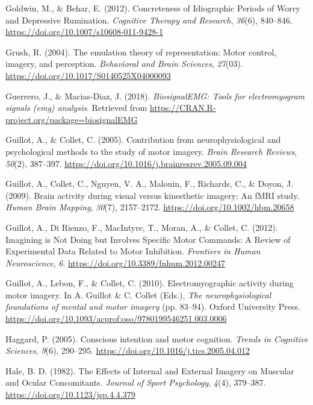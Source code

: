 \documentclass[a4paper,12pt,twoside,openright,oldfontcommands]{memoir}
\begin{document}
\hypertarget{ref-goldwin_concreteness_2012}{}
Goldwin, M., \& Behar, E. (2012). Concreteness of Idiographic Periods of
Worry and Depressive Rumination. \emph{Cognitive Therapy and Research},
\emph{36}(6), 840--846. \url{https://doi.org/10.1007/s10608-011-9428-1}

\hypertarget{ref-grush_emulation_2004}{}
Grush, R. (2004). The emulation theory of representation: Motor control,
imagery, and perception. \emph{Behavioral and Brain Sciences},
\emph{27}(03). \url{https://doi.org/10.1017/S0140525X04000093}

\hypertarget{ref-R-biosignalEMG}{}
Guerrero, J., \& Macias-Diaz, J. (2018). \emph{BiosignalEMG: Tools for
electromyogram signals (emg) analysis}. Retrieved from
\url{https://CRAN.R-project.org/package=biosignalEMG}

\hypertarget{ref-guillot_contribution_2005}{}
Guillot, A., \& Collet, C. (2005). Contribution from neurophysiological
and psychological methods to the study of motor imagery. \emph{Brain
Research Reviews}, \emph{50}(2), 387--397.
\url{https://doi.org/10.1016/j.brainresrev.2005.09.004}

\hypertarget{ref-guillot_brain_2009}{}
Guillot, A., Collet, C., Nguyen, V. A., Malouin, F., Richards, C., \&
Doyon, J. (2009). Brain activity during visual versus kinesthetic
imagery: An fMRI study. \emph{Human Brain Mapping}, \emph{30}(7),
2157--2172. \url{https://doi.org/10.1002/hbm.20658}

\hypertarget{ref-guillot_imagining_2012}{}
Guillot, A., Di Rienzo, F., MacIntyre, T., Moran, A., \& Collet, C.
(2012). Imagining is Not Doing but Involves Specific Motor Commands: A
Review of Experimental Data Related to Motor Inhibition. \emph{Frontiers
in Human Neuroscience}, \emph{6}.
\url{https://doi.org/10.3389/fnhum.2012.00247}

\hypertarget{ref-guillot_electromyographic_2010}{}
Guillot, A., Lebon, F., \& Collet, C. (2010). Electromyographic activity
during motor imagery. In A. Guillot \& C. Collet (Eds.), \emph{The
neurophysiological foundations of mental and motor imagery} (pp.
83--94). Oxford University Press.
\url{https://doi.org/10.1093/acprof:oso/9780199546251.003.0006}

\hypertarget{ref-haggard_conscious_2005}{}
Haggard, P. (2005). Conscious intention and motor cognition.
\emph{Trends in Cognitive Sciences}, \emph{9}(6), 290--295.
\url{https://doi.org/10.1016/j.tics.2005.04.012}

\hypertarget{ref-hale_effects_1982}{}
Hale, B. D. (1982). The Effects of Internal and External Imagery on
Muscular and Ocular Concomitants. \emph{Journal of Sport Psychology},
\emph{4}(4), 379--387. \url{https://doi.org/10.1123/jsp.4.4.379}
\end{document}
